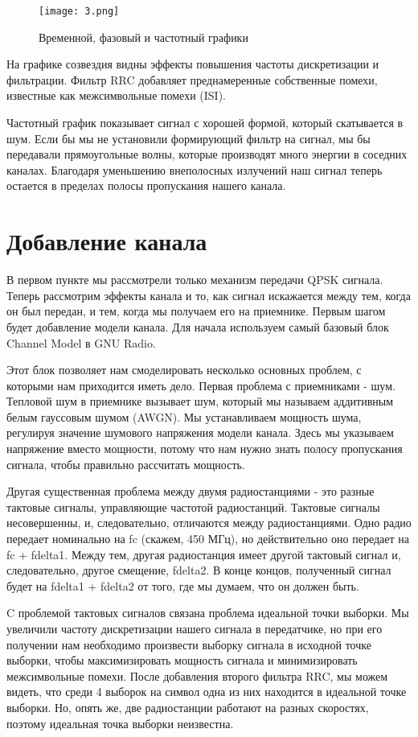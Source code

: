 \documentclass[a4paper,12pt]{report}
\begin{document}
\begin{figure}[H]
        \centering
        \texttt{[image: 3.png]}
        \caption{Временной, фазовый и частотный графики}
        \label{fig:ig4_1}
\end{figure}

На графике созвездия видны эффекты повышения частоты дискретизации и фильтрации. Фильтр RRC добавляет преднамеренные собственные помехи, известные как межсимвольные помехи (ISI). 

Частотный график показывает сигнал с хорошей формой, который скатывается в шум. Если бы мы не установили формирующий фильтр на сигнал, мы бы передавали прямоугольные волны, которые производят много энергии в соседних каналах. Благодаря уменьшению внеполосных излучений наш сигнал теперь остается в пределах полосы пропускания нашего канала. 

\section{Добавление канала}

В первом пункте мы рассмотрели только механизм передачи QPSK сигнала. Теперь рассмотрим эффекты канала и то, как сигнал искажается между тем, когда он был передан, и тем, когда мы получаем его на приемнике. Первым шагом будет добавление модели канала. Для начала используем самый базовый блок Channel Model в GNU Radio. 

Этот блок позволяет нам смоделировать несколько основных проблем, с которыми нам приходится иметь дело. Первая проблема с приемниками - шум. Тепловой шум в приемнике вызывает шум, который мы называем аддитивным белым гауссовым шумом (AWGN). Мы устанавливаем мощность шума, регулируя значение шумового напряжения модели канала. Здесь мы указываем напряжение вместо мощности, потому что нам нужно знать полосу пропускания сигнала, чтобы правильно рассчитать мощность.

Другая существенная проблема между двумя радиостанциями - это разные тактовые сигналы, управляющие частотой радиостанций. Тактовые сигналы несовершенны, и, следовательно, отличаются между радиостанциями. Одно радио передает номинально на fc (скажем, 450 МГц), но действительно оно передает на fc + fdelta1. Между тем, другая радиостанция имеет другой тактовый сигнал и, следовательно, другое смещение, fdelta2. В конце концов, полученный сигнал будет на fdelta1 + fdelta2 от того, где мы думаем, что он должен быть. 

C проблемой тактовых сигналов связана проблема идеальной точки выборки. Мы увеличили частоту дискретизации нашего сигнала в передатчике, но при его получении нам необходимо произвести выборку сигнала в исходной точке выборки, чтобы максимизировать мощность сигнала и минимизировать межсимвольные помехи. После добавления второго фильтра RRC, мы можем видеть, что среди 4 выборок на символ одна из них находится в идеальной точке выборки. Но, опять же, две радиостанции работают на разных скоростях, поэтому идеальная точка выборки неизвестна. 
\end{document}
